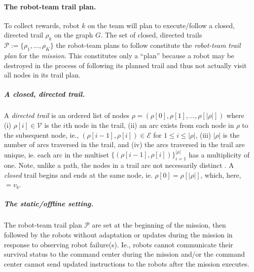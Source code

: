 \documentclass[11pt, oneside]{article}
\begin{document}
\paragraph{The robot-team trail plan.}
To collect rewards, robot $k$ on the team will plan to execute/follow a closed, directed trail $\rho_k$ on the graph $G$.  
The set of closed, directed trails $\mathcal{P}:=\{\rho_1, ..., \rho_K\}$ the robot-team plans to follow constitute the \emph{robot-team trail plan} for the \emph{mission}. 
This constitutes only a ``plan'' because a robot may be destroyed in the process of following its planned trail and thus not actually visit all nodes in its trail plan.

\vspace{-\baselineskip}
\subparagraph{A closed, directed trail.} 
A \emph{directed trail} is an ordered list of nodes $\rho = (\rho[0], \rho[1], ..., \rho[\lvert \rho \rvert])$ where
(i) $\rho[i] \in \mathcal{V}$ is the $i$th node in the trail,  
(ii) an arc exists from each node in $\rho$ to the subsequent node, ie., $(\rho[i-1], \rho[i])\in\mathcal{E}$ for $1 \leq i  \leq \lvert \rho \rvert$,
(iii) $\lvert \rho \rvert$ is the number of arcs traversed in the trail,
and
(iv) the arcs traversed in the trail are unique, ie. each arc in the multiset $\{(\rho[i-1], \rho[i])\}_{i=1}^{\lvert \rho \rvert}$ has a multiplicity of one.
Note, unlike a path, the nodes in a trail are not necessarily distinct \cite{wilson1979introduction}.
A \emph{closed} trail begins and ends at the same node, ie. $\rho [0]=\rho[\lvert \rho \rvert]$, which, here, $=v_b$.

\vspace{-\baselineskip}
\subparagraph{The static/offline setting.} 
The robot-team trail plan $\mathcal{P}$ are set at the beginning of the mission, then followed by the robots without adaptation or updates during the mission in response to observing robot failure(s).
Ie., robots cannot communicate their survival status to the command center during the mission and/or the command center cannot send updated instructions to the robots after the mission executes.
\end{document}
